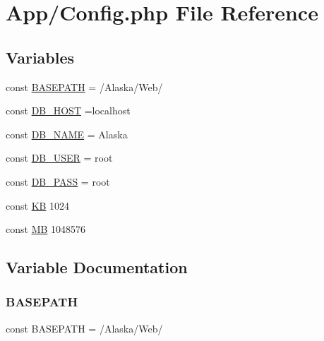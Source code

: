 \hypertarget{_config_8php}{}\section{App/\+Config.php File Reference}
\label{_config_8php}
\subsection*{Variables}
\begin{DoxyCompactItemize}
\item 
const \hyperlink{_config_8php_ad39801cabfd338dc5524466fe793fda9}{B\+A\+S\+E\+P\+A\+TH} = \textquotesingle{}/Alaska/Web/\textquotesingle{}
\item 
const \hyperlink{_config_8php_a293363d7988627f671958e2d908c202a}{D\+B\+\_\+\+H\+O\+ST} =\textquotesingle{}localhost\textquotesingle{}
\item 
const \hyperlink{_config_8php_ab5db0d3504f917f268614c50b02c53e2}{D\+B\+\_\+\+N\+A\+ME} = \textquotesingle{}Alaska\textquotesingle{}
\item 
const \hyperlink{_config_8php_a1d1d99f8e08f387d84fe9848f3357156}{D\+B\+\_\+\+U\+S\+ER} = \textquotesingle{}root\textquotesingle{}
\item 
const \hyperlink{_config_8php_a8bb9c4546d91667cfa61879d83127a92}{D\+B\+\_\+\+P\+A\+SS} = \textquotesingle{}root\textquotesingle{}
\item 
const \hyperlink{_config_8php_a4f06cdd0c63f3ce691804d6c90ea6c32}{KB} 1024
\item 
const \hyperlink{_config_8php_a91c734126e699a6ba53fe57e06bb8b49}{MB} 1048576
\end{DoxyCompactItemize}


\subsection{Variable Documentation}
\mbox{\label{_config_8php_ad39801cabfd338dc5524466fe793fda9}} 
\subsubsection{\texorpdfstring{B\+A\+S\+E\+P\+A\+TH}{BASEPATH}}
{\footnotesize\ttfamily const B\+A\+S\+E\+P\+A\+TH = \textquotesingle{}/Alaska/Web/\textquotesingle{}}

